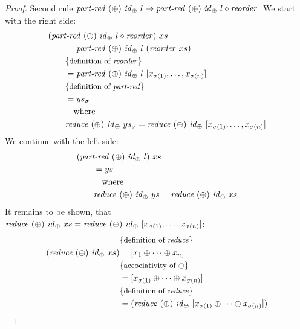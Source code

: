 \begin{proof}
  Second rule $\partRed\ (\oplus)\ \id_\oplus\ l \rightarrow \partRed\ (\oplus)\ \id_\oplus\ l \circ \reorder$.
  We start with the right side:
  \begin{align*}
    &(\partRed\ (\oplus)\ \id_\oplus\ l \circ \reorder)\ xs\\
    &\qquad = \partRed\ (\oplus)\ \id_\oplus\ l\ (\reorder\ xs)\\
    &\qquad \comment{definition of \reorder}\\
    &\qquad = \partRed\ (\oplus)\ \id_\oplus\ l\ [x_{\sigma(1)}, \ldots, x_{\sigma(n)}]\\
    &\qquad \comment{definition of \partRed}\\
    &\qquad = ys_\sigma\\
    &\qquad\quad \text{where}\\
    &\qquad \reduce\ (\oplus)\ \id_\oplus\ ys_\sigma = \reduce\ (\oplus)\ \id_\oplus\ [x_{\sigma(1)}, \ldots, x_{\sigma(n)}]
  \end{align*}
  We continue with the left side:
  \begin{align*}
    &(\partRed\ (\oplus)\ \id_\oplus\ l)\ xs\\
    &\qquad = ys\\
    &\qquad\quad \text{where}\\
    &\qquad \reduce\ (\oplus)\ \id_\oplus\ ys = \reduce\ (\oplus)\ \id_\oplus\ xs
  \end{align*}
  It remains to be shown, that\\ $ \reduce\ (\oplus)\ \id_\oplus\ xs = \reduce\ (\oplus)\ \id_\oplus\ [x_{\sigma(1)}, \ldots, x_{\sigma(n)}]$:
  \begin{align*}
      & \{\text{\small definition of \text{\textit{reduce}}}\}\\
    (\text{\textit{reduce}}\ (\oplus)\ \text{\textit{id}}_\oplus\ xs) &= [x_1 \oplus \dots \oplus x_n]\\
      & \{\text{\small accociativity of $\oplus$}\}\\
      & = [x_{\sigma(1)} \oplus \dots \oplus x_{\sigma(n)}]\\
      & \{\text{\small definition of \text{\textit{reduce}}}\}\\
      & = (\text{\textit{reduce}}\ (\oplus)\ \text{\textit{id}}_\oplus\ [x_{\sigma(1)} \oplus \dots \oplus x_{\sigma(n)}])
  \end{align*}
\end{proof}


